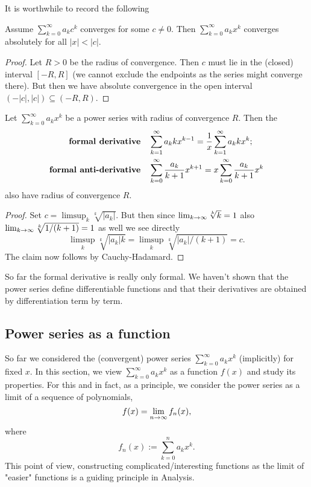 \documentclass[10pt, a4paper]{article}
\newcommand{\infsumo}[1][k = 0]{\sum_{#1}^{\infty}}
\begin{document}
It is worthwhile to record the following
\begin{corollary}
    Assume $\infsumo a_kc ^ k$ converges for some $c \neq 0$.
    Then $\infsumo a_kx ^ k$ converges absolutely for all $|x| < |c|$.
    \begin{proof}
        Let $R > 0$ be the radius of convergence.
        Then $c$ must lie in the
        (closed)
        interval $[-R, R]$
        (we cannot exclude the endpoints as the series might converge there).
        But then we have absolute convergence in the open interval $(-|c|, |c|) \subseteq (-R, R)$.
    \end{proof}
\end{corollary}

\begin{lemma}\label{pre:analy:lem:powseriescalc}
    Let $\infsumo a_kx ^ k$ be a power series with radius of convergence $R$.
    Then the
    \begin{align*}
        \textbf{formal derivative}\quad&\infsum a_kkx ^ {k - 1} = \frac{1}{x}\infsum a_kk x ^ {k}; \\
        \textbf{formal anti-derivative}\quad&\infsumo\frac{a_k}{k + 1}x ^ {k + 1} = x\infsumo\frac{a_k}{k + 1}x ^ {k}
    \end{align*}
    also have radius of convergence $R$.
    \begin{proof}
        Set $c = \limsup_{k}\sqrt[k]{|a_k|}$.
        But then since $\liminfty[k]\sqrt[k]{k} = 1$ also $\liminfty[k]\sqrt[k]{1 / (k + 1)} = 1$ as well we see directly
        \[
        \limsup_{k}\sqrt[k]{|a_k|k} = \limsup_{k}\sqrt[k]{|a_k| / (k + 1)} = c.
        \]
        The claim now follows by Cauchy-Hadamard.
    \end{proof}
\end{lemma}

\begin{remark}
    So far the formal derivative is really only formal.
    We haven't shown that the power series define differentiable functions and that their derivatives are obtained by differentiation term by term.
\end{remark}

\subsection{Power series as a function}

So far we considered the
(convergent)
power series $\infsumo a_kx ^ k$
(implicitly)
for fixed $x$.
In this section,
we view $\infsumo a_kx ^ k$ as a function $f(x)$ and study its properties.
For this and in fact,
as a principle,
we consider the power series as a limit of a sequence of polynomials,
\[
f(x) = \liminfty f_n(x),
\]
where
\[
f_n(x) := \sum_{k = 0}^{n}a_kx ^ k.
\]
This point of view,
constructing complicated/interesting functions as the limit of "easier" functions is a guiding principle in Analysis.
\end{document}
